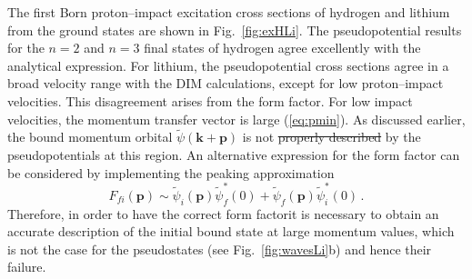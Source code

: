 \documentclass[10pt]{article}
\providecommand{\DIFaddtex}[1]{{\protect\color{blue}\uwave{#1}}} %
\providecommand{\DIFdeltex}[1]{{\protect\color{red}\sout{#1}}}                      %
\providecommand{\DIFaddbegin}{} %
\providecommand{\DIFaddend}{} %
\providecommand{\DIFdelbegin}{} %
\providecommand{\DIFdelend}{} %
\providecommand{\DIFadd}[1]{\texorpdfstring{\DIFaddtex{#1}}{#1}} %
\providecommand{\DIFdel}[1]{\texorpdfstring{\DIFdeltex{#1}}{}} %
\begin{document}
The first Born proton--impact excitation cross sections of hydrogen 
and lithium from the ground states are shown in Fig.~\ref{fig:exHLi}.
The pseudopotential results for the $n=2$ and $n=3$ final states of
hydrogen agree excellently with the analytical expression. For 
lithium, the pseudopotential cross sections agree in a broad velocity 
range with the DIM calculations, except for low proton--impact velocities. 
This disagreement arises from the form 
factor. For low impact velocities, the momentum transfer vector is large 
(\ref{eq:pmin}). As discussed earlier, the bound momentum orbital
$\widetilde{\psi}(\mathbf{k}+\mathbf{p})$ is not \DIFdelbegin \DIFdel{properly described }\DIFdelend \DIFaddbegin \DIFadd{described adequately 
}\DIFaddend by the pseudopotentials at this region. 
An alternative expression for the form factor can
be considered by implementing the peaking approximation
\begin{equation}
 F_{\!fi}(\mathbf{p}) \sim \widetilde{\psi}_i(\mathbf{p})\widetilde{\psi}_{\!f}^*(0)
 +\widetilde{\psi}_{\!f}(\mathbf{p})\widetilde{\psi}_i^*(0)\,.
\end{equation}
Therefore, in order to have the correct form factor\DIFaddbegin \DIFadd{, }\DIFaddend it is necessary to 
obtain an accurate description of the initial bound state at large
momentum values, which is not the case for the pseudostates (see 
Fig.~\ref{fig:wavesLi}b) and hence their failure.
\end{document}
